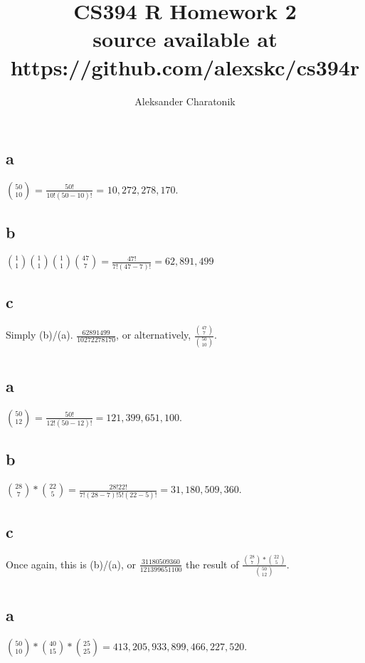 \documentclass[12pt]{article}
\title{CS394 R Homework 2\\
\large source available at https://github.com/alexskc/cs394r}
\author{Aleksander Charatonik}
\begin{document}
\maketitle

\section{}
\subsection*{a}
\(\binom{50}{10}\) = \(\frac{50!}{10!(50-10)!}\) = \(10,272,278,170\).
\subsection*{b}
\(\binom{1}{1}\binom{1}{1}\binom{1}{1}\binom{47}{7} = \frac{47!}{7!(47-7)!} = 62,891,499\)
\subsection*{c}
Simply (b)/(a). \(\frac{62891499}{10272278170}\), or alternatively, \(\frac{\binom{47}{7}}{\binom{50}{10}}\).

\section{}
\subsection*{a}
\(\binom{50}{12}\) = \(\frac{50!}{12!(50-12)!} = 121,399,651,100\).
\subsection*{b}
\(\binom{28}{7}*\binom{22}{5} = \frac{28!22!}{7!(28-7)!5!(22-5)!} =  31,180,509,360\).
\subsection*{c}
Once again, this is (b)/(a), or \(\frac{31180509360}{121399651100}\) the result of \(\frac{\binom{28}{7}*\binom{22}{5}}{\binom{50}{12}}\).

\section{}
\subsection*{a}
\(\binom{50}{10}*\binom{40}{15}*\binom{25}{25} = 413,205,933,899,466,227,520\).
\end{document}
